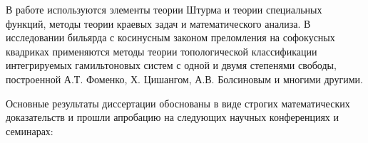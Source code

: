 
%
%
{\methods} В работе используются элементы теории Штурма и теории специальных функций, методы теории краевых задач и математического анализа. В исследовании бильярда с косинусным законом преломления на софокусных квадриках применяются методы теории топологической классификации интегрируемых
гамильтоновых систем с одной и двумя степенями свободы, построенной А.Т. Фоменко, Х. Цишангом, А.В. Болсиновым и многими другими.

{\influence} 

{\probation}
Основные результаты диссертации обоснованы в виде строгих математических доказательств и прошли апробацию на следующих научных конференциях и семинарах:

